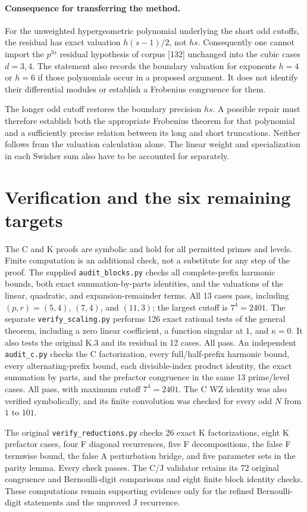 \documentclass[11pt,letterpaper]{article}
\numberwithin{equation}{section}
\begin{document}
\paragraph{Consequence for transferring the method.}
For the unweighted hypergeometric polynomial underlying the short odd
cutoffs, the residual has exact valuation $h(s-1)/2$, not $hs$.
Consequently one cannot import the $p^{3s}$ residual hypothesis of
corpus [132] unchanged into the cubic cases $d=3,4$.
The statement also records the boundary valuation for exponents $h=4$
or $h=6$ if those polynomials occur in a proposed argument. It does
not identify their differential modules or establish a Frobenius
congruence for them.

The longer odd cutoff restores the boundary precision $hs$. A possible
repair must therefore establish both the appropriate Frobenius theorem
for that polynomial and a sufficiently precise relation between its
long and short truncations. Neither follows from the valuation
calculation alone. The linear weight and specialization in each
Swisher sum also have to be accounted for separately.

\section{Verification and the six remaining targets}\label{loc-II-10}
The C and K proofs are symbolic and hold for
all permitted primes and levels. Finite computation is an additional
check, not a substitute for any step of the proof.
The supplied \texttt{audit\_blocks.py} checks all complete-prefix
harmonic bounds, both exact summation-by-parts identities, and the
valuations of the linear, quadratic, and expansion-remainder terms.
All 13 cases pass, including $(p,r)=(5,4)$, $(7,4)$, and $(11,3)$;
the largest cutoff is $7^4=2401$.
The separate \texttt{verify\_scaling.py} performs 126 exact rational
tests of the general theorem, including a zero linear coefficient,
a function singular at $1$, and $\kappa=0$. It also tests the original
K.3 and its residual in 12 cases. All pass.
An independent \texttt{audit\_c.py} checks the C factorization, every
full/half-prefix harmonic bound, every alternating-prefix bound,
each divisible-index product identity, the exact summation by parts,
and the prefactor congruence in the same 13 prime/level cases.
All pass, with maximum cutoff $7^4=2401$. The C WZ identity was also
verified symbolically, and its finite convolution was checked for
every odd $N$ from $1$ to $101$.

The original \texttt{verify\_reductions.py} checks 26 exact K
factorizations, eight K prefactor cases, four F diagonal recurrences,
five F decompositions, the false F termwise bound, the false A
perturbation bridge, and five parameter sets in the parity lemma.
Every check passes. The C/J validator retains its 72 original
congruence and Bernoulli-digit comparisons and eight finite block
identity checks. These computations remain supporting evidence only
for the refined Bernoulli-digit statements and the unproved J recurrence.
\end{document}
